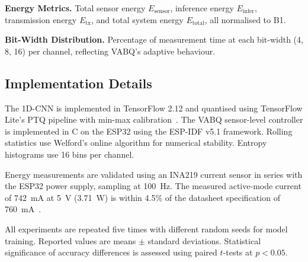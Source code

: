\textbf{Energy Metrics.} Total sensor energy $E_{\text{sensor}}$, inference energy $E_{\text{infer}}$, transmission energy $E_{\text{tx}}$, and total system energy $E_{\text{total}}$, all normalised to B1.

\textbf{Bit-Width Distribution.} Percentage of measurement time at each bit-width (4, 8, 16) per channel, reflecting VABQ's adaptive behaviour.

\subsection{Implementation Details}
\label{sec:exp_implementation}

The 1D-CNN is implemented in TensorFlow 2.12 and quantised using TensorFlow Lite's PTQ pipeline with min-max calibration~\cite{nagel2021whitepaper}. The VABQ sensor-level controller is implemented in C on the ESP32 using the ESP-IDF v5.1 framework. Rolling statistics use Welford's online algorithm for numerical stability. Entropy histograms use 16 bins per channel.

Energy measurements are validated using an INA219 current sensor in series with the ESP32 power supply, sampling at 100~Hz. The measured active-mode current of 742~mA at 5~V (3.71~W) is within 4.5\% of the datasheet specification of 760~mA~\cite{esp32power2025, karmakar2024exploring}.

All experiments are repeated five times with different random seeds for model training. Reported values are means $\pm$ standard deviations. Statistical significance of accuracy differences is assessed using paired $t$-tests at $p < 0.05$.
